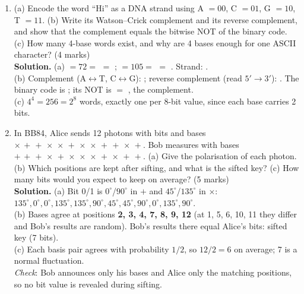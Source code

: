 \begin{enumerate}[leftmargin=1.6em,itemsep=4pt]
  \item (a) Encode the word ``Hi'' as a DNA strand using A $= 00$, C $= 01$, G $= 10$, T $= 11$. (b) Write its Watson--Crick complement and its reverse complement, and show that the complement equals the bitwise NOT of the binary code. (c) How many 4-base words exist, and why are 4 bases enough for one ASCII character? \hfill (4 marks)\\
  \textbf{Solution.} (a)  $= 72 = $  $=$ ;  $= 105 = $  $=$ . Strand: \textbf{}.\\
  (b) Complement (A$\leftrightarrow$T, C$\leftrightarrow$G): ; reverse complement (read $5'\to3'$): \textbf{}. The binary code is ; its NOT is  $=$ , the complement.\\
  (c) $4^4 = 256 = 2^8$ words, exactly one per 8-bit value, since each base carries 2 bits.

  \item In BB84, Alice sends 12 photons with bits  and bases $\times\,+\,+\,\times\,\times\,+\,\times\,\times\,+\,+\,\times\,+$. Bob measures with bases $+\,+\,+\,\times\,+\,\times\,\times\,\times\,+\,\times\,+\,+$. (a) Give the polarisation of each photon. (b) Which positions are kept after sifting, and what is the sifted key? (c) How many bits would you expect to keep on average? \hfill (5 marks)\\
  \textbf{Solution.} (a) Bit 0/1 is $0^\circ$/$90^\circ$ in $+$ and $45^\circ$/$135^\circ$ in $\times$: $135^\circ, 0^\circ, 0^\circ, 135^\circ, 135^\circ, 90^\circ, 45^\circ, 45^\circ, 90^\circ, 0^\circ, 135^\circ, 90^\circ$.\\
  (b) Bases agree at positions \textbf{2, 3, 4, 7, 8, 9, 12} (at 1, 5, 6, 10, 11 they differ and Bob's results are random). Bob's results there equal Alice's bits: sifted key \textbf{} (7 bits).\\
  (c) Each basis pair agrees with probability $1/2$, so $12/2 = 6$ on average; 7 is a normal fluctuation.\\
  \emph{Check}: Bob announces only his bases and Alice only the matching positions, so no bit value is revealed during sifting.


\end{enumerate}
